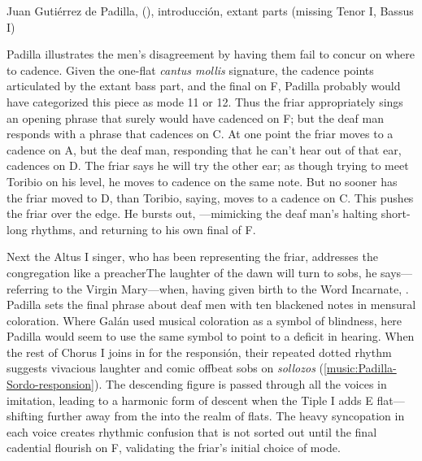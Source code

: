 \begin{musicexample}
    \caption{Juan Gutiérrez de Padilla, 
    (), introducción, extant parts (missing Tenor I,
    Bassus I)}

    \label{music:Padilla-Sordo-intro}
\end{musicexample}

Padilla illustrates the men's disagreement by having them fail to concur on
where to cadence.
Given the one-flat \emph{cantus mollis} signature, the cadence points
articulated by the extant bass part, and the final on F, Padilla probably would
have categorized this piece as mode 11 or 12.%
    \Autocites
    [873--882]{Cerone:Melopeo} 
    {Judd:RenaissanceModalTheory}{Barnett:TonalOrganization17C}  
Thus the friar appropriately sings an opening phrase that surely would have
cadenced on F; but the deaf man responds with a phrase that cadences on C.
At one point the friar moves to a cadence on A, but the deaf man, responding
that he can't hear out of that ear, cadences on D. 
The friar says he will try the other ear; as though trying to meet Toribio on
his level, he moves to cadence on the same note.
But no sooner has the friar moved to D, than Toribio, saying,  moves to a cadence on C.  
This pushes the friar over the edge.
He bursts out, ---mimicking the deaf man's
halting short-long rhythms, and returning to his own final of F.

Next the Altus I singer, who has been representing the friar, addresses the
congregation like a preacher{The laughter of the dawn will turn to
sobs}, he says---referring to the Virgin Mary---when, having given birth to the
Word Incarnate, .  
Padilla sets the final phrase about deaf men with ten blackened notes in
mensural coloration.
Where Galán used musical coloration as a symbol of blindness, here Padilla would
seem to use the same symbol to point to a deficit in hearing.
When the rest of Chorus I joins in for the responsión, their repeated dotted
rhythm suggests vivacious laughter and comic offbeat sobs on \emph{sollozos}
(\cref{music:Padilla-Sordo-responsion}).
The descending figure is passed through all the voices in imitation, leading to
a harmonic form of descent when the Tiple I adds E flat---shifting further away
from the  into the  realm of flats.
The heavy syncopation in each voice creates rhythmic confusion that is not
sorted out until the final cadential flourish on F, validating the friar's
initial choice of mode.

